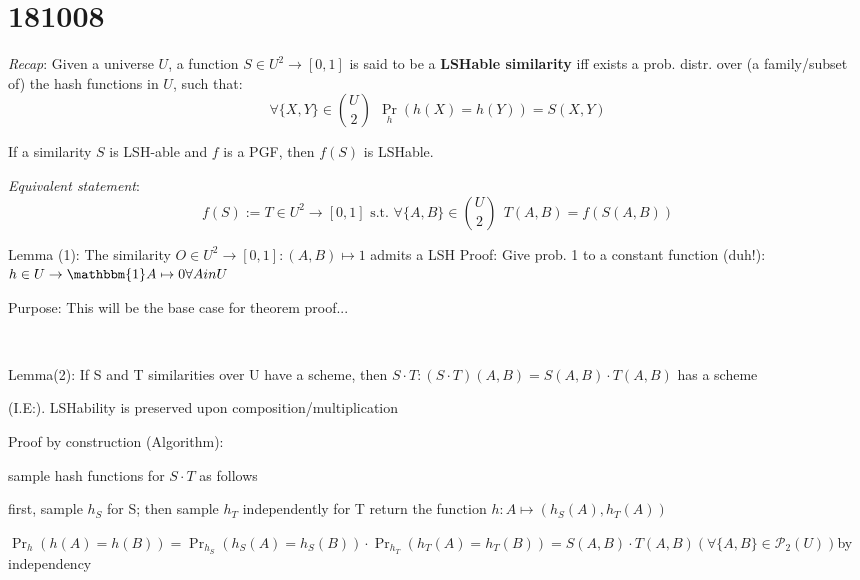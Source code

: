 \section{181008}  %
	
	\textit{Recap}: Given a universe $U$, a function $S \in U^2 \to [0, 1]$ is said to be a \textbf{LSHable similarity} iff exists a prob. distr. over (a family/subset of) the hash functions in $U$, such that: 
	\begin{equation}
	\forall \{X, Y\} \in \binom{U}{2}\ \ \Pr_h(h(X)=h(Y)) = S(X, Y)
	\end{equation}
	
	\thm If a similarity $S$ is LSH-able and $f$ is a PGF, then $f(S)$ is LSHable.
	
	\textit{Equivalent statement}:
	\begin{equation}
	f(S) := T \in U^2 \to [0, 1] \text{ s.t. } \forall \{A, B\} \in \binom{U}{2}\ \ T(A, B) = f(S(A, B))
	\end{equation}
	
	
	Lemma (1): The similarity $O \in U^2 \to [0, 1] : (A, B) \mapsto 1$ admits a LSH
	Proof: Give prob. 1 to a constant function (duh!): $h \in U \to \mathbbm{1} A \mapsto 0 \forall A in U$
	
	Purpose: This will be the base case for theorem proof...
	
	
	\
	
	Lemma(2): If S and T similarities over U have a scheme, then $S \cdot T : (S \cdot T)(A, B) = S(A, B)\cdot T(A, B)$ has a scheme
	
	(I.E:). LSHability is preserved upon composition/multiplication
	
	Proof by construction (Algorithm): 
	
	sample hash functions for $S \cdot T$ as follows
	
	first, sample $h_S$ for S;
	then sample $h_T$ independently for T
	return the function $h : A \mapsto (h_S(A), h_T(A))$
	
	$\Pr_h(h(A)=h(B)) = \Pr_{h_S}(h_S(A)=h_S(B)) \cdot \Pr_{h_T}(h_T(A)=h_T(B)) = S(A, B) \cdot T(A, B) (\forall \{A, B\} \in \mathcal{P}_2(U))$by independency
	
	
